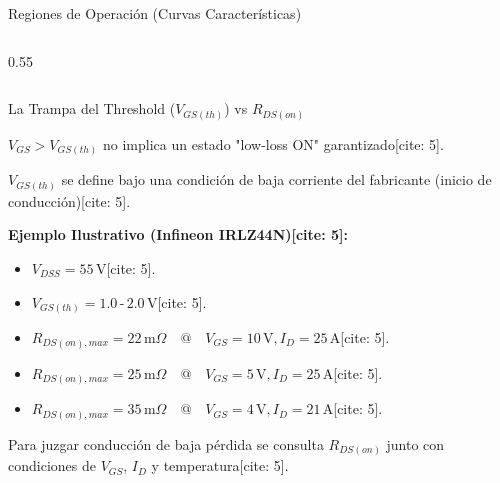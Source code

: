 \documentclass[aspectratio=169, table]{beamer}
\begin{document}
\begin{frame}{Regiones de Operación (Curvas Características)}
\begin{columns}[T]
\begin{column}{0.55\textwidth}
        \end{column}
    \end{columns}
\end{frame}

\begin{frame}{La Trampa del Threshold ($V_{GS(th)}$) vs $R_{DS(on)}$}
    \begin{tcolorbox}[colback=red!5, colframe=red!70!black, title=Regla Crítica]
        $V_{GS} > V_{GS(th)}$ no implica un estado "low-loss ON" garantizado[cite: 5].
    \end{tcolorbox}
    
    $V_{GS(th)}$ se define bajo una condición de baja corriente del fabricante (inicio de conducción)[cite: 5].
    
    \textbf{Ejemplo Ilustrativo (Infineon IRLZ44N)[cite: 5]:}
    \begin{itemize}
        \item $V_{DSS} = 55\,\text{V}$[cite: 5].
        \item $V_{GS(th)} = 1.0\,\text{-}\,2.0\,\text{V}$[cite: 5].
        \item $R_{DS(on),max} = 22\,\text{m}\Omega \quad @ \quad V_{GS}=10\,\text{V}, I_D=25\,\text{A}$[cite: 5].
        \item $R_{DS(on),max} = 25\,\text{m}\Omega \quad @ \quad V_{GS}=5\,\text{V}, I_D=25\,\text{A}$[cite: 5].
        \item $R_{DS(on),max} = 35\,\text{m}\Omega \quad @ \quad V_{GS}=4\,\text{V}, I_D=21\,\text{A}$[cite: 5].
    \end{itemize}
    Para juzgar conducción de baja pérdida se consulta $R_{DS(on)}$ junto con condiciones de $V_{GS}$, $I_D$ y temperatura[cite: 5].
\end{frame}
\end{document}
